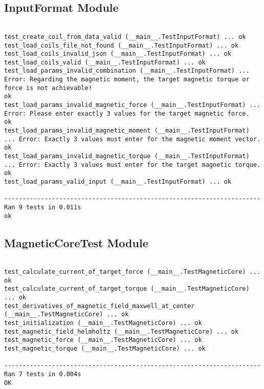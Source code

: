 \documentclass[12pt, titlepage]{article}
\begin{document}
\subsection{InputFormat Module}
\begin{small}
\begin{verbatim}

test_create_coil_from_data_valid (__main__.TestInputFormat) ... ok
test_load_coils_file_not_found (__main__.TestInputFormat) ... ok
test_load_coils_invalid_json (__main__.TestInputFormat) ... ok
test_load_coils_valid (__main__.TestInputFormat) ... ok
test_load_params_invalid_combination (__main__.TestInputFormat) ... Error: Regarding the magnetic moment, the target magnetic torque or force is not achievable!
ok
test_load_params_invalid_magnetic_force (__main__.TestInputFormat) ... Error: Please enter exactly 3 values for the target magnetic force.
ok
test_load_params_invalid_magnetic_moment (__main__.TestInputFormat) ... Error: Exactly 3 values must enter for the magnetic moment vector.
ok
test_load_params_invalid_magnetic_torque (__main__.TestInputFormat) ... Error: Exactly 3 values must enter for the target magnetic torque.
ok
test_load_params_valid_input (__main__.TestInputFormat) ... ok

----------------------------------------------------------------------
Ran 9 tests in 0.011s
ok

\end{verbatim}
\end{small}

\subsection{MagneticCoreTest Module}
\begin{small}
\begin{verbatim}

test_calculate_current_of_target_force (__main__.TestMagneticCore) ... ok
test_calculate_current_of_target_torque (__main__.TestMagneticCore) ... ok
test_derivatives_of_magnetic_field_maxwell_at_center (__main__.TestMagneticCore) ... ok
test_initialization (__main__.TestMagneticCore) ... ok
test_magnetic_field_helmholtz (__main__.TestMagneticCore) ... ok
test_magnetic_force (__main__.TestMagneticCore) ... ok
test_magnetic_torque (__main__.TestMagneticCore) ... ok

----------------------------------------------------------------------
Ran 7 tests in 0.004s
OK


\end{verbatim}
\end{small}
\end{document}
